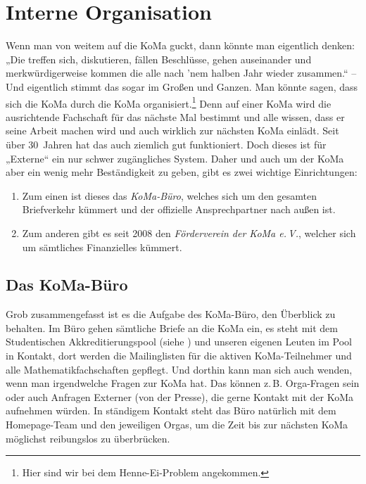\chapter{Interne Organisation}

Wenn man von weitem auf die KoMa guckt, dann könnte man
eigentlich denken: „Die treffen sich, diskutieren, fällen Beschlüsse,
gehen auseinander und merkwürdigerweise kommen die alle nach
'nem halben Jahr wieder zusammen.“ – Und eigentlich stimmt
das sogar im Großen und Ganzen. Man könnte sagen, dass sich
die KoMa durch die KoMa organisiert.\footnote{Hier sind wir bei dem Henne-Ei-Problem angekommen.} Denn auf einer KoMa
wird die ausrichtende Fachschaft für das nächste Mal bestimmt
und alle wissen, dass er seine Arbeit machen wird und auch
wirklich zur nächsten KoMa einlädt. Seit über 30~Jahren hat %
das auch ziemlich gut funktioniert.
Doch dieses ist für „Externe“ ein nur schwer zugängliches System.
Daher und auch um der KoMa aber ein wenig mehr Beständigkeit
zu geben, gibt es zwei wichtige Einrichtungen:

\begin{enumerate}
	\item Zum einen ist dieses das \emph{KoMa-Büro}, welches sich um den
		gesamten Briefverkehr kümmert und der offizielle Ansprechpartner nach
		außen ist.
	\item Zum anderen gibt es seit 2008 den \emph{Förderverein der KoMa
		e.\,V.}, welcher sich um sämtliches Finanzielles kümmert.
\end{enumerate}

\section{Das KoMa-Büro}
Grob zusammengefasst ist es die Aufgabe des KoMa-Büro, den Überblick zu
behalten. Im Büro gehen sämtliche Briefe an die KoMa ein, es steht mit dem
Studentischen Akkreditierungspool (siehe ) und unseren
eigenen Leuten im Pool in Kontakt, dort werden die Mailinglisten für die
aktiven KoMa-Teilnehmer und alle Mathematikfachschaften gepflegt. Und dorthin
kann man sich auch wenden, wenn man irgendwelche Fragen zur KoMa hat. Das
können z.\,B. Orga-Fragen sein oder auch Anfragen Externer (von der Presse),
die gerne Kontakt mit der KoMa aufnehmen würden. In ständigem Kontakt steht das
Büro natürlich mit dem Homepage-Team und den jeweiligen Orgas, um die Zeit bis
zur nächsten KoMa möglichst reibungslos zu überbrücken.

